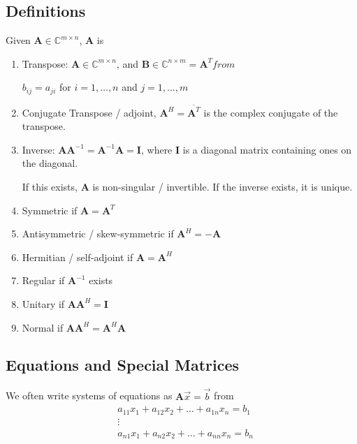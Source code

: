 \documentclass[12pt]{article}
\newcommand{\ve}[1]{\ensuremath{\mathbf{#1}}}
\newcommand{\cc}[1]{\ensuremath{\overline{#1}}}
\begin{document}
\subsection{Definitions}

Given $\ve{A} \in \mathbb{C}^{m \times n}$, \ve{A} is
%
\begin{enumerate}
\item Transpose: $\ve{A} \in \mathbb{C}^{m \times n}$, and $\ve{B} \in \mathbb{C}^{n \times m} = \ve{A}^T from$

$b_{	ij} = a_{ji}$ for $i = 1, \dots, n$ and $j = 1, \dots, m$

\item Conjugate Transpose / adjoint, $\ve{A}^H = \cc{\ve{A}^T}$ is the complex conjugate of the transpose. 

\item Inverse: $\ve{AA}^{-1} = \ve{A}^{-1}\ve{A} = \ve{I}$, where $\ve{I}$ is a diagonal matrix containing ones on the diagonal.

If this exists, $\ve{A}$ is non-singular / invertible. If the inverse exists, it is unique.

\item Symmetric if $\ve{A} = \ve{A}^T$

\item Antisymmetric / skew-symmetric if $\ve{A}^H = -\ve{A}$

\item Hermitian / self-adjoint if $\ve{A} = \ve{A}^H$

\item Regular if $\ve{A}^{-1}$ exists

\item Unitary if $\ve{A}\ve{A}^H = \ve{I}$

\item Normal if $\ve{A}\ve{A}^H = \ve{A}^H\ve{A}$
\end{enumerate}


\subsection{Equations and Special Matrices}

We often write systems of equations as $\ve{A}\vec{x} = \vec{b}$ from
\begin{align}
&a_{11} x_1 + a_{12} x_2 + \dots + a_{1n} x_n = b_1 \nonumber \\
&\vdots \nonumber \\
&a_{n1} x_1 + a_{n2} x_2 + \dots + a_{nn} x_n = b_n \nonumber
\end{align}
\end{document}
